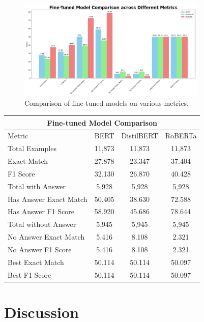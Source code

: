 \documentclass[12pt]{extarticle}
\begin{document}
\begin{figure}[h]
    \centering
    \includegraphics[width=0.8\textwidth]{images/model-metric-comparison.png}
    \caption{Comparison of fine-tuned models on various metrics.}
    \label{fig:comparison}
    \end{figure}

\begin{center}
    \begin{tabular}{|l|c|c|c|}
    \hline
    \multicolumn{4}{|c|}{\textbf{Fine-tuned Model Comparison}} \\
    \hline
    Metric & BERT & DistilBERT & RoBERTa \\
    \hline
    Total Examples & 11,873 & 11,873 & 11,873 \\
    \hline
    Exact Match & 27.878 & 23.347 & 37.404 \\
    F1 Score & 32.130 & 26.870 & 40.428 \\
    \hline
    Total with Answer & 5,928 & 5,928 & 5,928 \\
    Has Answer Exact Match & 50.405 & 38.630 & 72.588 \\
    Has Answer F1 Score & 58.920 & 45.686 & 78.644 \\
    \hline
    Total without Answer & 5,945 & 5,945 & 5,945 \\
    No Answer Exact Match & 5.416 & 8.108 & 2.321 \\
    No Answer F1 Score & 5.416 & 8.108 & 2.321 \\
    \hline
    Best Exact Match & 50.114 & 50.114 & 50.097 \\
    Best F1 Score & 50.114 & 50.114 & 50.097 \\
    \hline
    \end{tabular}
\end{center}

\section{Discussion}
\end{document}
